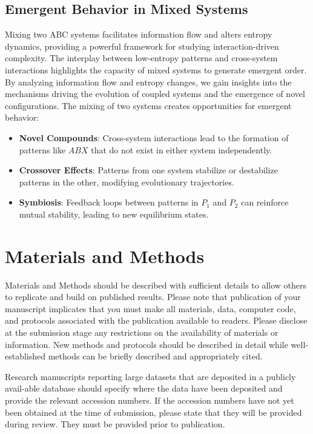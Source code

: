 \documentclass[entropy,article,submit,pdftex,moreauthors]{Definitions/mdpi}
\begin{document}
\subsection{Emergent Behavior in Mixed Systems}

Mixing two ABC systems facilitates information flow and alters entropy dynamics, providing a powerful framework for studying interaction-driven complexity. The interplay between low-entropy patterns and cross-system interactions highlights the capacity of mixed systems to generate emergent order. By analyzing information flow and entropy changes, we gain insights into the mechanisms driving the evolution of coupled systems and the emergence of novel configurations. The mixing of two systems creates opportunities for emergent behavior:
\begin{itemize}
    \item \textbf{Novel Compounds}: Cross-system interactions lead to the formation of patterns like \( ABX \) that do not exist in either system independently.
    \item \textbf{Crossover Effects}: Patterns from one system stabilize or destabilize patterns in the other, modifying evolutionary trajectories.
    \item \textbf{Symbiosis}: Feedback loops between patterns in \( P_1 \) and \( P_2 \) can reinforce mutual stability, leading to new equilibrium states.
\end{itemize}


\section{Materials and Methods}

Materials and Methods should be described with sufficient details to allow others to replicate and build on published results. Please note that publication of your manuscript implicates that you must make all materials, data, computer code, and protocols associated with the publication available to readers. Please disclose at the submission stage any restrictions on the availability of materials or information. New methods and protocols should be described in detail while well-established methods can be briefly described and appropriately cited.

Research manuscripts reporting large datasets that are deposited in a publicly avail-able database should specify where the data have been deposited and provide the relevant accession numbers. If the accession numbers have not yet been obtained at the time of submission, please state that they will be provided during review. They must be provided prior to publication.
\end{document}
